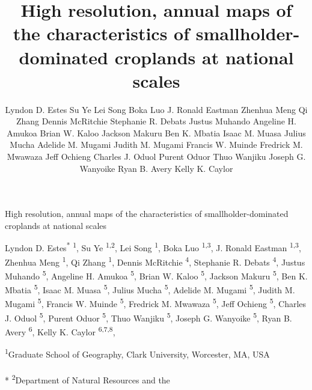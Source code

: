 \documentclass[11pt,a4paper]{article}
\title{High resolution, annual maps of the characteristics of
smallholder-dominated croplands at national scales}
\author{
Lyndon D. Estes
Su Ye
Lei Song
Boka Luo
J. Ronald Eastman
Zhenhua Meng
Qi Zhang
Dennis McRitchie
Stephanie R. Debats
Justus Muhando
Angeline H. Amukoa
Brian W. Kaloo
Jackson Makuru
Ben K. Mbatia
Isaac M. Muasa
Julius Mucha
Adelide M. Mugami
Judith M. Mugami
Francis W. Muinde
Fredrick M. Mwawaza
Jeff Ochieng
Charles J. Oduol
Purent Oduor
Thuo Wanjiku
Joseph G. Wanyoike
Ryan B. Avery
Kelly K. Caylor
}
\date{}
\begin{document}
\begin{singlespace}
\begin{center}
\huge High resolution, annual maps of the characteristics of
smallholder-dominated croplands at national scales
\end{center}
\begin{center}
\large
Lyndon D. Estes\textsuperscript{*} \textsuperscript{1}, 
Su Ye \textsuperscript{1,2}, 
Lei Song \textsuperscript{1}, 
Boka Luo \textsuperscript{1,3}, 
J. Ronald Eastman \textsuperscript{1,3}, 
Zhenhua Meng \textsuperscript{1}, 
Qi Zhang \textsuperscript{1}, 
Dennis McRitchie \textsuperscript{4}, 
Stephanie R. Debats \textsuperscript{4}, 
Justus Muhando \textsuperscript{5}, 
Angeline H. Amukoa \textsuperscript{5}, 
Brian W. Kaloo \textsuperscript{5}, 
Jackson Makuru \textsuperscript{5}, 
Ben K. Mbatia \textsuperscript{5}, 
Isaac M. Muasa \textsuperscript{5}, 
Julius Mucha \textsuperscript{5}, 
Adelide M. Mugami \textsuperscript{5}, 
Judith M. Mugami \textsuperscript{5}, 
Francis W. Muinde \textsuperscript{5}, 
Fredrick M. Mwawaza \textsuperscript{5}, 
Jeff Ochieng \textsuperscript{5}, 
Charles J. Oduol \textsuperscript{5}, 
Purent Oduor \textsuperscript{5}, 
Thuo Wanjiku \textsuperscript{5}, 
Joseph G. Wanyoike \textsuperscript{5}, 
Ryan B. Avery \textsuperscript{6}, 
Kelly K. Caylor \textsuperscript{6,7,8}, 
\end{center}
\begin{justify}
\footnotesize\textsuperscript{1}Graduate School of Geography, Clark
University, Worcester, MA, USA\\\\*
\footnotesize\textsuperscript{2}Department of Natural Resources and the

\end{justify}
\end{singlespace}
\end{document}
